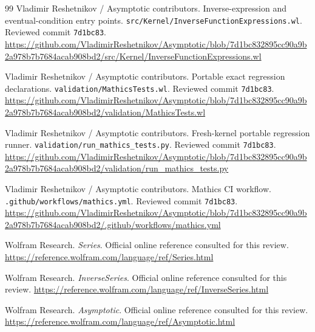 \documentclass[11pt,letterpaper]{article}
\newcommand{\code}[1]{\nolinkurl{#1}}
\begin{document}
\begin{thebibliography}{99}
 Vladimir Reshetnikov / Asymptotic contributors. Inverse-expression and eventual-condition entry points.\newline
\code{src/Kernel/InverseFunctionExpressions.wl}. Reviewed commit \code{7d1bc83}.\newline
\url{https://github.com/VladimirReshetnikov/Asymptotic/blob/7d1bc832895cc90a9b2a978b7b7684acab908bd2/src/Kernel/InverseFunctionExpressions.wl}

 Vladimir Reshetnikov / Asymptotic contributors. Portable exact regression declarations.\newline
\code{validation/MathicsTests.wl}. Reviewed commit \code{7d1bc83}.\newline
\url{https://github.com/VladimirReshetnikov/Asymptotic/blob/7d1bc832895cc90a9b2a978b7b7684acab908bd2/validation/MathicsTests.wl}

 Vladimir Reshetnikov / Asymptotic contributors. Fresh-kernel portable regression runner.\newline
\code{validation/run_mathics_tests.py}. Reviewed commit \code{7d1bc83}.\newline
\url{https://github.com/VladimirReshetnikov/Asymptotic/blob/7d1bc832895cc90a9b2a978b7b7684acab908bd2/validation/run_mathics_tests.py}

 Vladimir Reshetnikov / Asymptotic contributors. Mathics CI workflow.\newline
\code{.github/workflows/mathics.yml}. Reviewed commit \code{7d1bc83}.\newline
\url{https://github.com/VladimirReshetnikov/Asymptotic/blob/7d1bc832895cc90a9b2a978b7b7684acab908bd2/.github/workflows/mathics.yml}

 Wolfram Research. \emph{Series}. Official online reference consulted for this review.\newline
\url{https://reference.wolfram.com/language/ref/Series.html}

 Wolfram Research. \emph{InverseSeries}. Official online reference consulted for this review.\newline
\url{https://reference.wolfram.com/language/ref/InverseSeries.html}

 Wolfram Research. \emph{Asymptotic}. Official online reference consulted for this review.\newline
\url{https://reference.wolfram.com/language/ref/Asymptotic.html}


\end{thebibliography}
\end{document}
